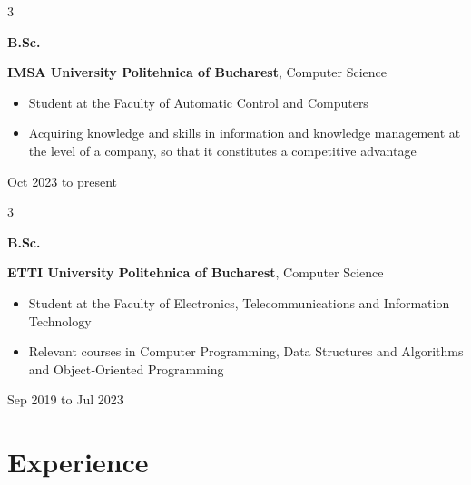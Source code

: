 \documentclass[10pt, letterpaper]{article}
\newenvironment{highlights}{
    \begin{itemize}[
        topsep=0.10 cm,
        parsep=0.10 cm,
        partopsep=0pt,
        itemsep=0pt,
        leftmargin=0.4 cm + 10pt
    ]
}{
    \end{itemize}
} %
\newenvironment{threecolentry}[3][]{
    \onecolentry
    \def\thirdColumn{#3}
    \setcolumnwidth{1 cm, \fill, 3.5 cm}
    \begin{paracol}{3}
    {\raggedright #2} \switchcolumn
}{
    \switchcolumn \raggedleft \thirdColumn
    \end{paracol}
    \endonecolentry
} %
\begin{document}
        
        \begin{threecolentry}{\textbf{B.Sc.}}{
            Oct 2023 to present
        }
            \textbf{IMSA University Politehnica of Bucharest}, Computer Science
            \begin{highlights}
                \item Student at the Faculty of Automatic Control and Computers
                \item Acquiring knowledge and skills in information and knowledge management at the level of a company, so that it constitutes a competitive advantage
            \end{highlights}
        \end{threecolentry}

        \vspace{0.2 cm}

        \begin{threecolentry}{\textbf{B.Sc.}}{
            Sep 2019 to Jul 2023
        }
            \textbf{ETTI University Politehnica of Bucharest}, Computer Science
            \begin{highlights}
                \item Student at the Faculty of Electronics, Telecommunications and Information Technology
                \item Relevant courses in Computer Programming, Data Structures and Algorithms and Object‑Oriented Programming
            \end{highlights}
        \end{threecolentry}


    
    \section{Experience}
\end{document}

